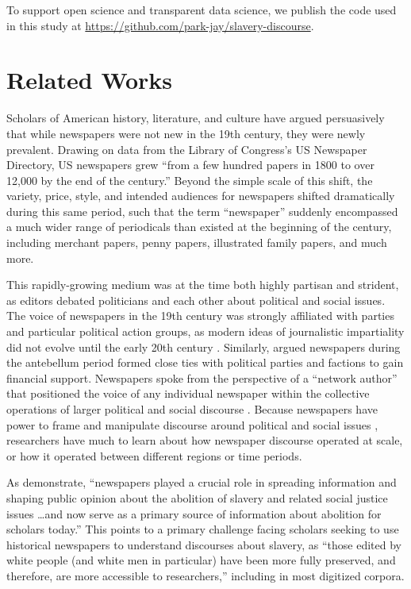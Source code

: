 \documentclass[11pt]{article}
\begin{document}
To support open science and transparent data science, we publish the code used in this study at \url{https://github.com/park-jay/slavery-discourse}.

\section{Related Works}

Scholars of American history, literature, and culture have argued persuasively that while newspapers were not new in the 19th century, they were newly prevalent.
Drawing on data from the Library of Congress's US Newspaper Directory, US newspapers grew ``from a few hundred papers in 1800 to over 12,000 by the end of the century.'' \cite{cordell2020going} 
Beyond the simple scale of this shift, the variety, price, style, and intended audiences for newspapers shifted dramatically during this same period, such that the term ``newspaper'' suddenly encompassed a much wider range of periodicals than existed at the beginning of the century, including merchant papers, penny papers, illustrated family papers, and much more.

This rapidly-growing medium was at the time both highly partisan and strident, as editors debated politicians and each other about political and social issues. 
The voice of newspapers in the 19th century was strongly affiliated with parties and particular political action groups, as modern ideas of journalistic impartiality did not evolve until the early 20th century \citep{pasley_tyranny_2002}. 
Similarly, \citet{baldasty_commercialization_1992} argued newspapers during the antebellum period formed close ties with political parties and factions to gain financial support. Newspapers spoke from the perspective of a ``network author'' that positioned the voice of any individual newspaper within the collective operations of larger political and social discourse \citep{cordell_reprinting_2015}.
Because newspapers have power to frame and manipulate discourse around political and social issues \citep{willaert2022tracking}, researchers have much to learn about how newspaper discourse operated at scale, or how it operated between different regions or time periods.

As \citet{soni2021abolitionist} demonstrate, ``newspapers played a crucial role in spreading information and shaping public opinion about the abolition of slavery and related social justice issues \dots and now serve as a primary source of information about abolition for scholars today.''
This points to a primary challenge facing scholars seeking to use historical newspapers to understand discourses about slavery, as ``those edited by white people (and white men in particular) have been more fully preserved, and therefore, are more accessible to researchers,'' including in most digitized corpora. 
\end{document}
